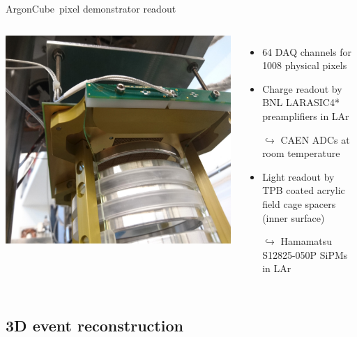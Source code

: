 \documentclass[]{beamer}
\newcommand*{\emphcol}{blue}
\newcommand*{\AC}{{ArgonCube}}
\begin{document}
\begin{frame}{\AC\ pixel demonstrator readout}
	\begin{columns}[c]
		\centering
		\includegraphics[width=\textwidth]{viper/viper_sipm}
		\begin{itemize}
			\item \num{64} DAQ channels for \num{1008} physical pixels
			\item {\color{\emphcol} Charge readout by BNL LARASIC4* preamplifiers in LAr}
			\item[$\hookrightarrow$] CAEN ADCs at room temperature
			\item Light readout by TPB coated acrylic field cage spacers (inner surface)
			\item[$\hookrightarrow$] {\color{\emphcol} Hamamatsu S12825-050P SiPMs in LAr}
		\end{itemize}
	\end{columns}
\end{frame}

\subsection{3D event reconstruction}
\end{document}
